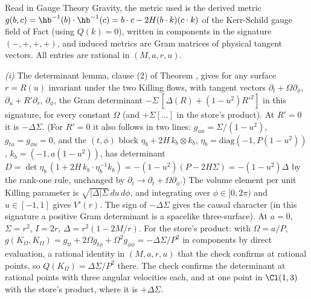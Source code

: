 Read in Gauge Theory Gravity, the metric used is the derived metric $g(b,c) = \hb^{-1}(b)\cdot\hb^{-1}(c) = b\cdot c - 2H(b\cdot k)(c\cdot k)$ of the Kerr-Schild gauge field of Fact  (using $Q(k) = 0$), written in components in the signature $(-,+,+,+)$, and induced metrics are Gram matrices of physical tangent vectors. All entries are rational in $(M, a, r, u)$.

\emph{(i)} The determinant lemma, clause (2) of Theorem , gives for any surface $r = R(u)$ invariant under the two Killing flows, with tangent vectors $\partial_t + \Omega\partial_\phi$, $\partial_u + R'\partial_r$, $\partial_\phi$, the Gram determinant $-\Sigma\,[\Delta(R) + (1-u^2)R'^2]$ in this signature, for every constant $\Omega$ (and $+\Sigma[\ldots]$ in the store's product). At $R' = 0$ it is $-\Delta\Sigma$. (For $R' = 0$ it also follows in two lines: $g_{uu} = \Sigma/(1-u^2)$, $g_{tu} = g_{\phi u} = 0$, and the $(t,\phi)$ block $\eta_b + 2H\,k_b\otimes k_b$, $\eta_b = \mathrm{diag}(-1, P(1-u^2))$, $k_b = (-1, a(1-u^2))$, has determinant $D = \det\eta_b\,(1 + 2H\,k_b\cdot\eta_b^{-1}k_b) = -(1-u^2)(P - 2H\Sigma) = -(1-u^2)\Delta$ by the rank-one rule, unchanged by $\partial_t \to \partial_t + \Omega\partial_\phi$.) The volume element per unit Killing parameter is $\sqrt{|\Delta|\Sigma}\,du\,d\phi$, and integrating over $\phi \in [0,2\pi)$ and $u \in [-1,1]$ gives $V'(r)$. The sign of $-\Delta\Sigma$ gives the causal character (in this signature a positive Gram determinant is a spacelike three-surface). At $a = 0$, $\Sigma = r^2$, $I = 2r$, $\Delta = r^2(1 - 2M/r)$. For the store's product: with $\Omega = a/P$, $g(K_\Omega, K_\Omega) = g_{tt} + 2\Omega g_{t\phi} + \Omega^2g_{\phi\phi} = -\Delta\Sigma/P^2$ in components by direct evaluation, a rational identity in $(M, a, r, u)$ that the check confirms at rational points, so $Q(K_\Omega) = \Delta\Sigma/P^2$ there. The check confirms the determinant at rational points with three angular velocities each, and at one point in $\Cl(1,3)$ with the store's product, where it is $+\Delta\Sigma$.

